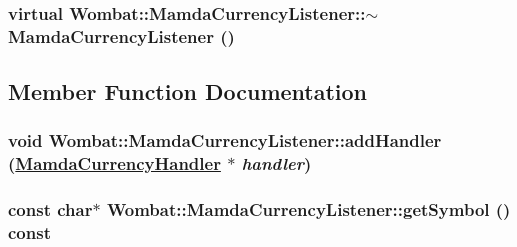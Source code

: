 \hypertarget{classWombat_1_1MamdaCurrencyListener_250629c22714ba9d7ac3f52cef462f86}{
\subsubsection[$\sim$MamdaCurrencyListener]{\setlength{\rightskip}{0pt plus 5cm}virtual Wombat::Mamda\-Currency\-Listener::$\sim$Mamda\-Currency\-Listener ()}}
\label{classWombat_1_1MamdaCurrencyListener_250629c22714ba9d7ac3f52cef462f86}




\subsection{Member Function Documentation}
\hypertarget{classWombat_1_1MamdaCurrencyListener_120979ebd57b91ead52d29e344b224d1}{
\subsubsection[addHandler]{\setlength{\rightskip}{0pt plus 5cm}void Wombat::Mamda\-Currency\-Listener::add\-Handler (\hyperlink{classWombat_1_1MamdaCurrencyHandler}{Mamda\-Currency\-Handler} $\ast$ {\em handler})}}
\label{classWombat_1_1MamdaCurrencyListener_120979ebd57b91ead52d29e344b224d1}


\hypertarget{classWombat_1_1MamdaCurrencyListener_6c9b1053a22182c09cdfd9ac020d71b9}{
\subsubsection[getSymbol]{\setlength{\rightskip}{0pt plus 5cm}const char$\ast$ Wombat::Mamda\-Currency\-Listener::get\-Symbol () const}}
\label{classWombat_1_1MamdaCurrencyListener_6c9b1053a22182c09cdfd9ac020d71b9}


